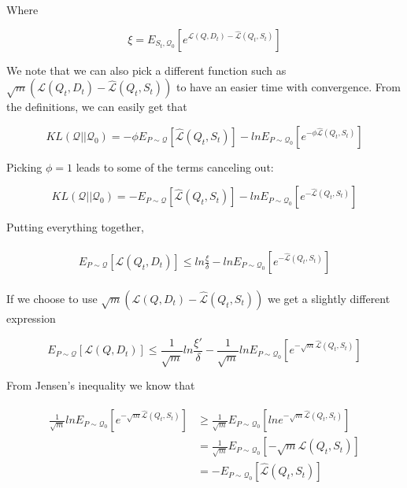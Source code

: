 \documentclass[letterpaper]{article}
\theoremstyle{definition}
\begin{document}
Where 

$$ \xi = E_{S_t, \mathcal{Q}_0}\left [e^{\mathcal{L}(Q, D_t) - \hat{\mathcal{L}}(Q_t, S_t)} \right ]$$

We note that we can also pick a different function such as $\sqrt{m}\left (\mathcal{L}(Q_t, D_t) - \hat{\mathcal{L}}(Q_t, S_t) \right )$ to have an easier time with convergence.
From the definitions, we can easily get that

$$ KL(\mathcal{Q}||\mathcal{Q}_0) = -\phi E_{P\sim \mathcal{Q}}\left [ \hat{\mathcal{L}}(Q_t, S_t)  \right ] -ln E_{P\sim \mathcal{Q}_0} \left [e^{-\phi \hat{\mathcal{L}}(Q_t, S_t)}\right ]$$

Picking $\phi=1$ leads to some of the terms canceling out:

$$ KL(\mathcal{Q}||\mathcal{Q}_0) = -E_{P\sim \mathcal{Q}}\left [ \hat{\mathcal{L}}(Q_t, S_t)  \right ] -ln E_{P\sim \mathcal{Q}_0} \left [e^{-\hat{\mathcal{L}}(Q_t, S_t)}\right ]$$


Putting everything together,


\begin{align} 
\begin{split}
E_{P\sim \mathcal{Q}} \left [\mathcal{L}(Q_t, D_t)\right ] \leq  ln\frac{\xi}{\delta} -ln E_{P\sim \mathcal{Q}_0} \left [e^{-\hat{\mathcal{L}}(Q_t, S_t)}\right ]
\end{split}
\end{align}


If we choose to use $\sqrt{m}\left (\mathcal{L}(Q, D_t) - \hat{\mathcal{L}}(Q_t, S_t) \right )$ we get a slightly different expression

$$ E_{P\sim \mathcal{Q}} \left [\mathcal{L}(Q, D_t)\right ] \leq  \frac{1}{\sqrt{m}}ln\frac{\xi'}{\delta} -\frac{1}{\sqrt{m}}ln E_{P\sim \mathcal{Q}_0} \left [e^{-\sqrt{m}\hat{\mathcal{L}}(Q_t, S_t)}\right ] $$

From Jensen's inequality we know that 

\begin{align*} 
\begin{split}
\frac{1}{\sqrt{m}}ln E_{P\sim \mathcal{Q}_0} \left [e^{-\sqrt{m}\hat{\mathcal{L}}(Q_t, S_t)}\right ] & \geq \frac{1}{\sqrt{m}} E_{P\sim \mathcal{Q}_0} \left [ln e^{-\sqrt{m}\hat{\mathcal{L}}(Q_t, S_t)}\right ] \\
&= \frac{1}{\sqrt{m}} E_{P\sim \mathcal{Q}_0} \left [-\sqrt{m}\hat{\mathcal{L}}(Q_t, S_t)\right ]\\
&= - E_{P\sim \mathcal{Q}_0} \left [\hat{\mathcal{L}}(Q_t, S_t)\right ]
\end{split}
\end{align*}
\end{document}
